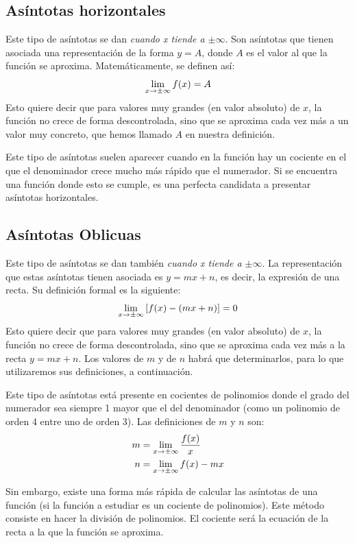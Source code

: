 \documentclass[sans]{apuntes}
\begin{document}
\subsection{Asíntotas horizontales}
Este tipo de asíntotas se dan \emph{cuando x tiende a $\pm \infty$}. Son asíntotas que tienen asociada una representación de la forma $y = A$, donde $A$ es el valor al que la función se aproxima. Matemáticamente, se definen así:
\[\displaystyle\lim_{x\to \pm \infty} f(x) = A\]
Esto quiere decir que para valores muy grandes (en valor absoluto) de $x$, la función no crece de forma descontrolada, sino que se aproxima cada vez más a un valor muy concreto, que hemos llamado $A$ en nuestra definición.
\par Este tipo de asíntotas suelen aparecer cuando en la función hay un cociente en el que el denominador crece mucho más rápido que el numerador. Si se encuentra una función donde esto se cumple, es una perfecta candidata a presentar asíntotas horizontales.

\subsection{Asíntotas Oblicuas}
\label{sec:oblicuas}
Este tipo de asíntotas se dan también \emph{cuando x tiende a $\pm \infty$}. La representación que estas asíntotas tienen asociada es $y = mx + n$, es decir, la expresión de una recta. Su definición formal es la siguiente:
\[\displaystyle\lim_{x\to \pm \infty} \left[f(x) - (mx + n)\right]= 0\]
Esto quiere decir que para valores muy grandes (en valor absoluto) de $x$, la función no crece de forma descontrolada, sino que se aproxima cada vez más a la recta $y = mx + n$. Los valores de $m$ y de $n$ habrá que determinarlos, para lo que utilizaremos sus definiciones, a continuación.
\par Este tipo de asíntotas está presente en cocientes de polinomios donde el grado del numerador sea siempre 1 mayor que el del denominador (como un polinomio de orden 4 entre uno de orden 3). Las definiciones de $m$ y $n$ son:
\begin{align*}
	m & = \displaystyle\lim_{x \to \pm \infty} \dfrac{f(x)}{x} \\
	n & = \displaystyle\lim_{x \to \pm \infty} f(x) - mx       \\
\end{align*}

Sin embargo, existe una forma más rápida de calcular las asíntotas de una función (si la función a estudiar es un cociente de polinomios). Este método consiste en hacer la división de polinomios. El cociente será la ecuación de la recta a la que la función se aproxima.
\\
\par {}
\end{document}
